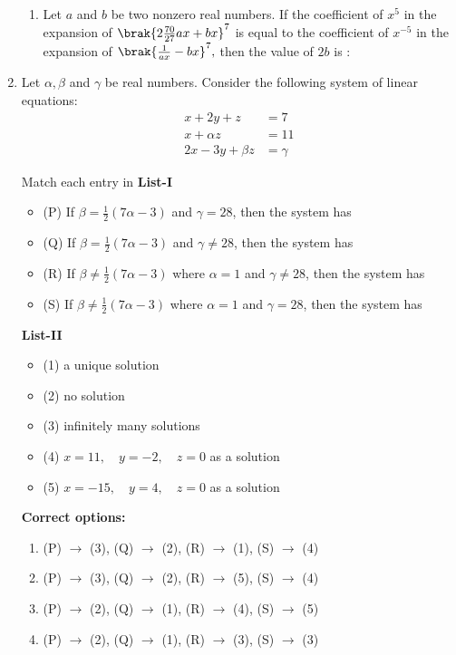 \documentclass[12pt,a4paper]{article}
\begin{document}
\begin{enumerate}
\begin{enumerate}
\item Let \( a \) and \( b \) be two nonzero real numbers. If the coefficient of \( x^5 \) in the expansion of 
$
\brak{ 2 \frac{70}{27} ax + bx}^7
$
is equal to the coefficient of \( x^{-5} \) in the expansion of 
$
\brak{ \frac{1}{ax} - bx}^7,
$
then the value of \( 2b \) is :
\end{enumerate}

\item Let $\alpha, \beta$ and $\gamma$ be real numbers. Consider the following system of linear equations:
\begin{align*}
    x + 2y + z &= 7 \\
    x + \alpha z &= 11 \\
    2x - 3y + \beta z &= \gamma
\end{align*}

Match each entry in 
\textbf{List-I}
\begin{itemize}
\item (P) If $\beta = \frac{1}{2} (7\alpha - 3)$ and $\gamma = 28$, then the system has
\item (Q) If $\beta = \frac{1}{2} (7\alpha - 3)$ and $\gamma \neq 28$, then the system has
\item (R) If $\beta \neq \frac{1}{2} (7\alpha - 3)$ where $\alpha = 1$ and $\gamma \neq 28$, then the system has
\item (S) If $\beta \neq \frac{1}{2} (7\alpha - 3)$ where $\alpha = 1$ and $\gamma = 28$, then the system has
\end{itemize}

\textbf{List-II}
\begin{itemize}
    \item (1) a unique solution
    \item (2) no solution
    \item (3) infinitely many solutions
    \item (4) $x = 11, \quad y = -2, \quad z = 0$ as a solution
    \item (5) $x = -15, \quad y = 4, \quad z = 0$ as a solution
\end{itemize}

\textbf{Correct options:}
\begin{enumerate}
\item (P) $\to$ (3), (Q) $\to$ (2), (R) $\to$ (1), (S) $\to$ (4)
\item (P) $\to$ (3), (Q) $\to$ (2), (R) $\to$ (5), (S) $\to$ (4)
\item (P) $\to$ (2), (Q) $\to$ (1), (R) $\to$ (4), (S) $\to$ (5)
\item (P) $\to$ (2), (Q) $\to$ (1), (R) $\to$ (3), (S) $\to$ (3)
\end{enumerate}


\end{enumerate}
\end{document}
